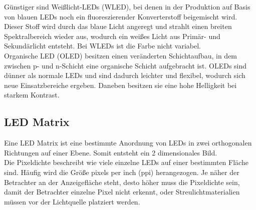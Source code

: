 Günstiger sind Weißlicht-LEDs (WLED), bei denen in der Produktion auf Basis von blauen LEDs noch ein fluoreszierender Konverterstoff beigemischt wird. Dieser Stoff wird durch das blaue Licht angeregt und strahlt einen breiten Spektralbereich wieder aus, wodurch ein weißes Licht aus Primär- und Sekundärlicht entsteht. Bei WLEDs ist die Farbe nicht variabel. \cite[Vgl. Seite 194]{LofflerMang.2020} \\
Organische LED (OLED) besitzen einen veränderten Schichtaufbau, in dem zwischen p- und n-Schicht eine organische Schicht aufgebracht ist. OLEDs sind dünner als normale LEDs und sind dadurch leichter und flexibel, wodurch sich neue Einsatzbereiche ergeben. Daneben besitzen sie eine hohe Helligkeit bei starkem Kontrast. \cite[Vgl. Seite 195]{LofflerMang.2020}
\subsection{LED Matrix}
Eine LED Matrix ist eine bestimmte Anordnung von LEDs in zwei orthogonalen Richtungen auf einer Ebene. Somit entsteht ein 2 dimensionales Bild.\\ 
Die Pixeldichte beschreibt wie viele einzelne LEDs auf einer bestimmten Fläche sind. Häufig wird die Größe \glqq pixels per inch\grqq{} (ppi) herangezogen. Je näher der Betrachter an der Anzeigefläche steht, desto höher muss die Pixeldichte sein, damit der Betrachter einzelne Pixel nicht erkennt, oder Streulichtmaterialien müssen vor der Lichtquelle platziert werden.
